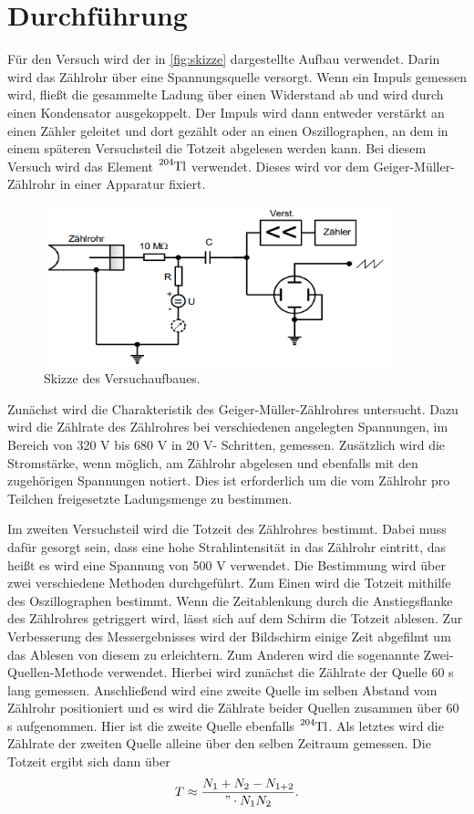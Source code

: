 \section{Durchführung}
\label{sec:Durchführung}
Für den Versuch wird der in \autoref{fig:skizze} dargestellte Aufbau verwendet. Darin wird das Zählrohr über eine Spannungsquelle
versorgt. Wenn ein Impuls gemessen wird, fließt die gesammelte Ladung über einen Widerstand ab und wird durch einen Kondensator
ausgekoppelt. Der Impuls wird dann entweder verstärkt an einen Zähler geleitet und dort gezählt oder an einen Oszillographen, an dem
in einem späteren Versuchsteil die Totzeit abgelesen werden kann. Bei diesem Versuch wird das Element $\ce{^{204}Tl}$ verwendet. Dieses
wird vor dem Geiger-Müller-Zählrohr in einer Apparatur fixiert.
\begin{figure}
    \centering
    \includegraphics[width=0.9\textwidth]{content/skizze.png}
    \caption{Skizze des Versuchaufbaues.}
    \label{fig:skizze}
\end{figure}

Zunächst wird die Charakteristik des Geiger-Müller-Zählrohres untersucht. Dazu wird die Zählrate des Zählrohres bei verschiedenen
angelegten Spannungen, im Bereich von 320 V bis 680 V in 20 V- Schritten, gemessen. Zusätzlich wird die Stromstärke, wenn möglich, am
Zählrohr abgelesen und ebenfalls mit den zugehörigen Spannungen notiert. Dies ist erforderlich um die vom Zählrohr pro Teilchen
freigesetzte Ladungsmenge zu bestimmen.

Im zweiten Versuchsteil wird die Totzeit des Zählrohres bestimmt. Dabei muss dafür gesorgt sein, dass eine
hohe Strahlintensität in das Zählrohr eintritt, das heißt es wird eine Spannung von 500 V verwendet.
Die Bestimmung wird über zwei verschiedene Methoden durchgeführt. 
Zum Einen wird die Totzeit mithilfe des Oszillographen bestimmt. Wenn die Zeitablenkung durch die Anstiegsflanke des Zählrohres
getriggert wird, lässt sich auf dem Schirm die Totzeit ablesen. Zur Verbesserung des Messergebnisses wird der Bildschirm einige Zeit
abgefilmt um das Ablesen von diesem zu erleichtern. Zum Anderen wird die sogenannte Zwei-Quellen-Methode verwendet. Hierbei wird 
zunächst die Zählrate der Quelle 60 s lang gemessen. Anschließend wird eine zweite Quelle im selben Abstand vom Zählrohr positioniert
und es wird die Zählrate beider Quellen zusammen über 60 s aufgenommen. Hier ist die zweite Quelle ebenfalls $\ce{^{204}Tl}$.
Als letztes wird die Zählrate der zweiten Quelle alleine über den selben Zeitraum gemessen. Die Totzeit ergibt sich dann über
\begin{equation}
\label{eqn:totzeit}
T \approx \frac{N_1 + N_2 - N_{1+2}}{"\cdot N_1 N_2}.
\end{equation}
